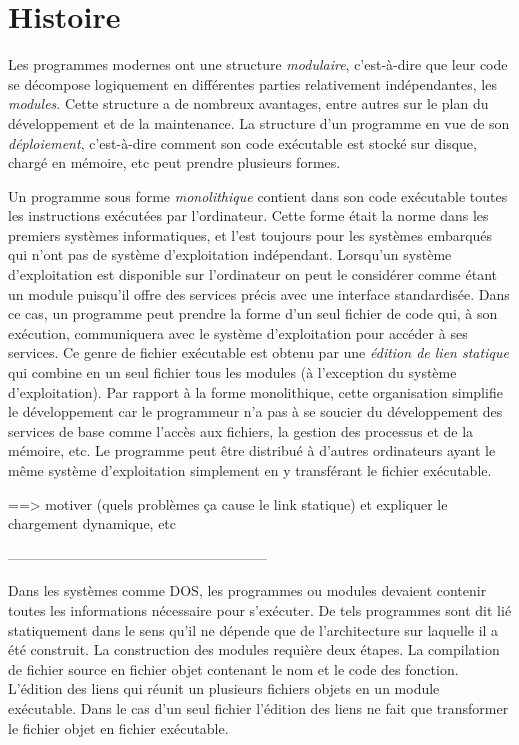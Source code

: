 
\chapter[]{Histoire}%

Les programmes modernes ont une structure \textit{modulaire},
c'est-à-dire que leur code se décompose logiquement en différentes
parties relativement indépendantes, les \textit{modules}.  Cette
structure a de nombreux avantages, entre autres sur le plan du
développement et de la maintenance.  La structure d'un programme en
vue de son \textit{déploiement}, c'est-à-dire comment son code
exécutable est stocké sur disque, chargé en mémoire, etc peut prendre
plusieurs formes.

Un programme sous forme \textit{monolithique} contient dans son code
exécutable toutes les instructions exécutées par l'ordinateur.  Cette
forme était la norme dans les premiers systèmes informatiques, et
l'est toujours pour les systèmes embarqués qui n'ont pas de système
d'exploitation indépendant.  Lorsqu'un système d'exploitation est
disponible sur l'ordinateur on peut le considérer comme étant un
module puisqu'il offre des services précis avec une interface
standardisée.  Dans ce cas, un programme peut prendre la forme d'un
seul fichier de code qui, à son exécution, communiquera avec le
système d'exploitation pour accéder à ses services.  Ce genre de
fichier exécutable est obtenu par une \textit{édition de lien
  statique} qui combine en un seul fichier tous les modules (à
l'exception du système d'exploitation).  Par rapport à la forme
monolithique, cette organisation simplifie le développement car le
programmeur n'a pas à se soucier du développement des services de base
comme l'accès aux fichiers, la gestion des processus et de la mémoire,
etc.  Le programme peut être distribué à d'autres ordinateurs ayant le
même système d'exploitation simplement en y transférant le fichier
exécutable.

==> motiver (quels problèmes ça cause le link statique) et expliquer le chargement dynamique, etc


--------------------------------------------------------


Dans les systèmes comme DOS, les programmes ou modules devaient contenir toutes les
informations nécessaire pour s'exécuter. De tels programmes sont dit lié
statiquement dans le sens qu'il ne dépende que de l'architecture sur laquelle il
a été construit. La construction des modules requière deux étapes. La compilation
de fichier source en fichier objet contenant le nom et le code des fonction.
L'édition des liens qui réunit un plusieurs fichiers objets en un module exécutable.
Dans le cas d'un seul fichier l'édition des liens ne fait que transformer le fichier
objet en fichier exécutable.

